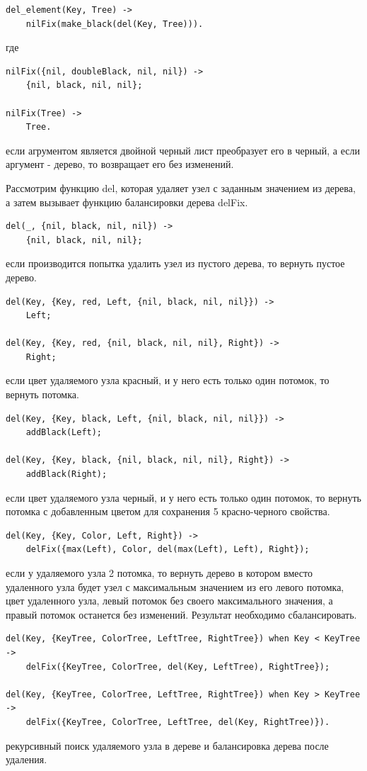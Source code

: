 			\begin{lstlisting}
del_element(Key, Tree) -> 
	nilFix(make_black(del(Key, Tree))).
			\end{lstlisting}
			где 
			\begin{lstlisting}
nilFix({nil, doubleBlack, nil, nil}) ->
	{nil, black, nil, nil};
	
nilFix(Tree) ->
	Tree.					
			\end{lstlisting}	
			если агрументом является двойной черный лист преобразует его в черный,
			а если аргумент - дерево, то возвращает его без изменений.
			
			Рассмотрим функцию del, которая удаляет узел с заданным значением из дерева,
			а затем вызывает функцию балансировки дерева delFix. 
			\begin{lstlisting}
del(_, {nil, black, nil, nil}) ->
	{nil, black, nil, nil};
			\end{lstlisting}
			если производится попытка удалить узел из пустого дерева, то вернуть пустое дерево.
			\begin{lstlisting}
del(Key, {Key, red, Left, {nil, black, nil, nil}}) ->
	Left;
	
del(Key, {Key, red, {nil, black, nil, nil}, Right})	->
	Right;
			\end{lstlisting}
			если цвет удаляемого узла красный, и у него есть только один потомок, то
			вернуть потомка.
			\begin{lstlisting}
del(Key, {Key, black, Left, {nil, black, nil, nil}}) ->
	addBlack(Left);
		
del(Key, {Key, black, {nil, black, nil, nil}, Right}) ->
	addBlack(Right);
			\end{lstlisting}
			если цвет удаляемого узла черный, и у него есть только один потомок, то
			вернуть потомка с добавленным цветом для сохранения 5 красно-черного свойства.
			\begin{lstlisting}
del(Key, {Key, Color, Left, Right})	->
	delFix({max(Left), Color, del(max(Left), Left), Right});
			\end{lstlisting}
			если у удаляемого узла 2 потомка, то вернуть дерево в котором вместо удаленного 
			узла будет узел с максимальным значением из его левого потомка, цвет удаленного узла, 
			левый потомок без своего максимального значения, а правый потомок останется без изменений.
			Результат необходимо сбалансировать.
			\begin{lstlisting}
del(Key, {KeyTree, ColorTree, LeftTree, RightTree}) when Key < KeyTree 	->
	delFix({KeyTree, ColorTree, del(Key, LeftTree), RightTree});
			
del(Key, {KeyTree, ColorTree, LeftTree, RightTree}) when Key > KeyTree 	->	
	delFix({KeyTree, ColorTree, LeftTree, del(Key, RightTree)}).
			\end{lstlisting}
			рекурсивный поиск удаляемого узла в дереве и балансировка дерева после 
			удаления.
			
